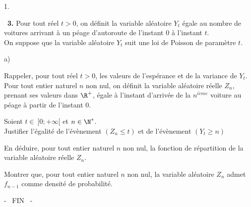\documentclass[11pt]{article}%
\begin{document}
\begin{noliste}{1.}
\item[ \ \textbf{3.}] Pour tout réel $t>0$, on définit la variable
aléatoire $Y_{t}$ égale au nombre de voitures arrivant à un péage
d'autoroute de
l'instant $0$ à l'instant $t$.\\
On suppose que la variable aléatoire $Y_{t}$ suit une loi de Poisson de
paramètre $t$.

\begin{noliste}{a)}
 \setlength{\itemsep}{2mm}
\item Rappeler, pour tout réel $t>0$, les valeurs de l'espérance et de
la
variance de $Y_{t}$.\\
Pour tout entier naturel $n$ non nul, on définit la variable aléatoire
réelle $Z_{n}$, prenant ses valeurs dans $\R^{+}$, égale à l'instant
d'arrivée de la $n^{i\grave{e}me}$ voiture au péage à partir de
l'instant $0$.

\item Soient $t\in \ ]0; + \infty \lbrack $ et $n\in \N^{\ast }$.\\
Justifier l'égalité de l'évènement $(Z_{n}\leq t)$ et de l'évènement
$(Y_{t}\geq n)$

\item En déduire, pour tout entier naturel $n$ non nul, la fonction de
répartition de la variable aléatoire réelle $Z_{n}$.

\item Montrer que, pour tout entier naturel $n$ non nul, la variable
aléatoire $Z_{n}$ admet $f_{n-1}$ comme densité de probabilité.
\end{noliste}
\end{noliste}

\begin{center}
{- \ FIN \ -}
\end{center}

\label{fin}
\end{document}
